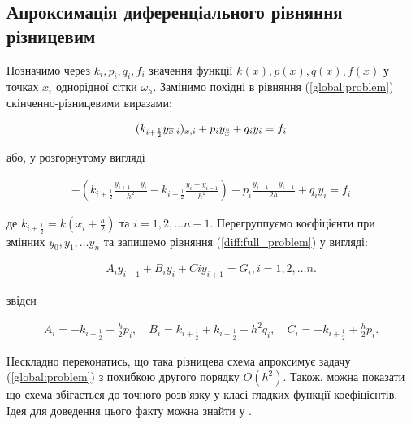 \subsection{Апроксимація диференціального рівняння різницевим}

Позначимо через \( k_i, p_i, q_i, f_i \) значення функції \( k(x), p(x), q(x), f(x)\) у точках \( x_i \) однорідної сітки \( \overline{\omega}_h \). Замінимо похідні в рівняння (\ref{global:problem}) скінченно-різницевими виразами:

\begin{equation}
\begin{multlined} \label{diff:compact_problem}
(k_{i+\frac{1}{2}} y_{\overline{x}, i})_{x, i} + p_i y_{\accentset{\circ}{x}} + q_iy_i = f_i
\end{multlined}
\end{equation}

або, у розгорнутому вигляді

\begin{equation}
\begin{multlined} \label{diff:full_problem}
-\left( k_{i+\frac{1}{2}} \frac{y_{i+1} - y_i}{h^2} - k_{i-\frac{1}{2}} \frac{y_i - y_{i-1}}{h^2}\right) + p_i \frac{y_{i+1} - y_{i-1}}{2h} + q_iy_i = f_i
\end{multlined}
\end{equation}

де \( k_{i+\frac{1}{2}} = k(x_i + \frac{h}{2})\) та \( i = 1, 2, \dots n-1 \). Перегруппуємо коєфіцієнти при змінних \( y_0, y_1, \dots y_n\) та запишемо рівняння (\ref{diff:full_problem}) у вигляді:

\begin{equation}
\begin{multlined} \label{diff:general_form}
A_iy_{i-1} + B_iy_i + Ciy_{i+1} = G_i, i = 1, 2, \dots n.
\end{multlined}
\end{equation}

звідси

\begin{equation}
\begin{multlined} \label{diff:grouped}
A_i = -k_{i+\frac{1}{2}} - \frac{h}{2}p_i, \quad B_i = k_{i+\frac{1}{2}} + k_{i - \frac{1}{2}} + h^2q_i, \quad C_i = -k_{i+\frac{1}{2}} + \frac{h}{2}p_i.
\end{multlined}
\end{equation}

Нескладно переконатись, що така різницева схема апроксимує задачу (\ref{global:problem}) з похибкою другого порядку \( O(h^2)\). Також, можна показати що схема збігається до точного розв'язку у класі гладких функції коефіцієнтів. Ідея для доведення цього факту можна знайти у \cite[с. 106--108]{Samarskii71}.

